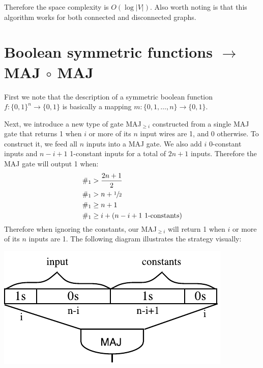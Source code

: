\documentclass{article}
\begin{document}
Therefore the space complexity is $O(\log |V|)$.
Also worth noting is that this algorithm works for both connected and disconnected graphs.

\section{Boolean symmetric functions $\rightarrow$ MAJ $\circ$ MAJ}

First we note that the description of a symmetric boolean function $f:\{0,1\}^n\rightarrow \{0,1\}$ is basically a mapping $m:\{0,1,\dotsc,n\}\rightarrow \{0,1\}$.

Next, we introduce a new type of gate MAJ$_{\geq i}$ constructed from a single MAJ gate that returns 1 when $i$ or more of its $n$ input wires are 1, and 0 otherwise. To construct it, we feed all $n$ inputs into a MAJ gate. We also add $i$ 0-constant inputs and $n-i+1$ 1-constant inputs for a total of $2n+1$ inputs. Therefore the MAJ gate will output 1 when:
\begin{align*}
\#_1 &> \frac{2n+1}{2} \\
\#_1 &> n + \sfrac{1}{2} \\
\#_1 &\geq n + 1 \\
\#_1 &\geq i + (n-i+1 \text{ 1-constants})
\end{align*}
Therefore when ignoring the constants, our MAJ$_{\geq i}$ will return 1 when $i$ or more of its $n$ inputs are 1. The following diagram illustrates the strategy visually:

\includegraphics{q3_maj_geq.pdf}

\end{document}

